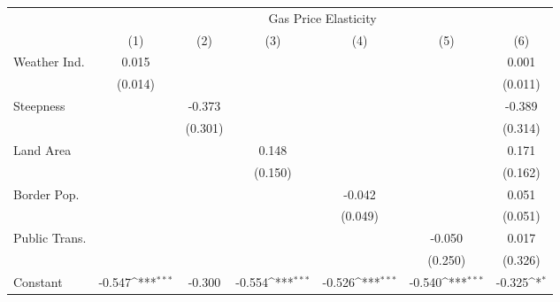 {
\def\sym#1{\ifmmode^{#1}\else\(^{#1}\)\fi}
\begin{tabular}{l*{6}{c}}
\hline\hline
            &\multicolumn{6}{c}{Gas Price Elasticity}                                                                                           \\
            &\multicolumn{1}{c}{(1)}         &\multicolumn{1}{c}{(2)}         &\multicolumn{1}{c}{(3)}         &\multicolumn{1}{c}{(4)}         &\multicolumn{1}{c}{(5)}         &\multicolumn{1}{c}{(6)}         \\
\hline
Weather Ind.&       0.015         &                     &                     &                     &                     &       0.001         \\
            &     (0.014)         &                     &                     &                     &                     &     (0.011)         \\
[1em]
Steepness   &                     &      -0.373         &                     &                     &                     &      -0.389         \\
            &                     &     (0.301)         &                     &                     &                     &     (0.314)         \\
[1em]
Land Area   &                     &                     &       0.148         &                     &                     &       0.171         \\
            &                     &                     &     (0.150)         &                     &                     &     (0.162)         \\
[1em]
Border Pop. &                     &                     &                     &      -0.042         &                     &       0.051         \\
            &                     &                     &                     &     (0.049)         &                     &     (0.051)         \\
[1em]
Public Trans.&                     &                     &                     &                     &      -0.050         &       0.017         \\
            &                     &                     &                     &                     &     (0.250)         &     (0.326)         \\
[1em]
Constant    &      -0.547\sym{***}&      -0.300         &      -0.554\sym{***}&      -0.526\sym{***}&      -0.540\sym{***}&      -0.325\sym{*}  \\

\end{tabular}}

